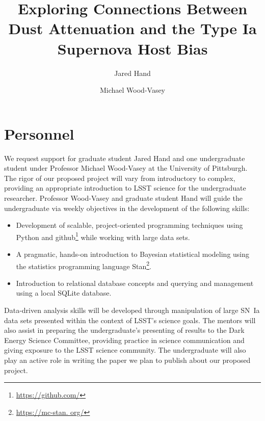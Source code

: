 \documentclass[modern]{aastex63}
\begin{document}
\title{Exploring Connections Between Dust Attenuation and the Type Ia Supernova Host Bias}

\author{Jared Hand}
\author{Michael Wood-Vasey}
\section{Personnel}
We request support for graduate student Jared Hand and one undergraduate student under Professor Michael Wood-Vasey at the University of Pittsburgh.
The rigor of our proposed project will vary from introductory to complex, providing an appropriate introduction to LSST science for the undergraduate researcher.
Professor Wood-Vasey and graduate student Hand will guide the undergraduate via weekly objectives in the development of the following skills:
\begin{itemize}
    \item Development of scalable, project-oriented programming techniques using Python and github\footnote{\url{https://github.com/}} while working with large data sets.
    \item A pragmatic, hands-on introduction to Bayesian statistical modeling using the statistics programming language Stan\footnote{\url{https://mc-stan.
    org/}}.
    \item Introduction to relational database concepts and querying and management using a local SQLite database.
\end{itemize}
Data-driven analysis skills will be developed through manipulation of large SN~Ia data sets presented within the context of LSST's science goals.
The mentors will also assist in preparing the undergraduate's presenting of results to the Dark Energy Science Committee, providing practice in science communication and giving exposure to the LSST science community.
The undergraduate will also play an active role in writing the paper we plan to publish about our proposed project.
\end{document}
